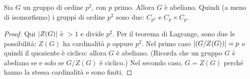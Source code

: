 
%

\begin{coro}\label{coro:GruppiP2}
Sia $G$ un gruppo di ordine $p^2$, con $p$ primo. Allora $G$ è abeliano. Quindi (a meno di isomorfismo) i gruppi di ordine $p^2$ sono due: $C_{p^2}$ e $C_p \times C_p$.
\end{coro}

\begin{proof}
Qui $\left\lvert Z(G)\right\rvert$ è $>1$ e divide $p^2$. Per il teorema di Lagrange, sono due le possibilità: $Z(G)$ ha cardinalità $p$ oppure $p^2$. Nel primo caso $\left\lvert(G/Z(G))\right\rvert = p$ e quindi il quoziente è ciclico: allora $G$ è abeliano. (Ricorda che un gruppo $G$ è abeliano se e solo se $G/Z(G)$ è ciclico.) Nel secondo caso, $G = Z(G)$ perché hanno la stessa cardinalità e sono finiti.
\end{proof}